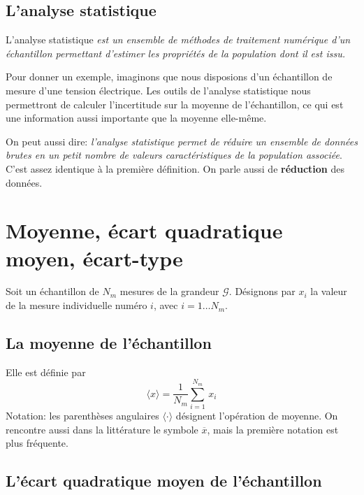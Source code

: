 \documentclass[main.tex]{subfiles}
\begin{document}
\subsection{L'analyse statistique}

L'analyse statistique \textit{est un ensemble de méthodes de traitement numérique d'un échantillon permettant d'estimer les propriétés de la population dont il est issu.}

Pour donner un exemple, imaginons que nous disposions d'un échantillon de mesure d'une tension électrique. Les outils de l'analyse statistique nous permettront de calculer l'incertitude sur la moyenne de l'échantillon, ce qui est une information aussi importante que la moyenne elle-même.

On peut aussi dire: \textit{l'analyse statistique permet de réduire un ensemble de données brutes en un petit nombre de valeurs caractéristiques de la population associée}. C'est assez identique à la première définition. On parle aussi de \textbf{réduction} des données.

\section{Moyenne, écart quadratique moyen, écart-type}

Soit un échantillon de $N_m$ mesures de la grandeur $\mathcal{G}$. Désignons par $x_i$ la valeur de la mesure individuelle numéro $i$, avec $i=1\dots N_m$.

\subsection{La moyenne de l'échantillon}

Elle est définie par
\begin{equation}
    \langle x\rangle=\frac{1}{N_m}\sum\limits_{i=1}^{N_m}\,x_i
\end{equation}
Notation: les parenthèses angulaires $\langle\cdot\rangle$ désignent l'opération de moyenne. On rencontre aussi dans la littérature le symbole $\overline{x}$, mais la première notation est plus fréquente.

\subsection{L'écart quadratique moyen de l'échantillon}
\end{document}
